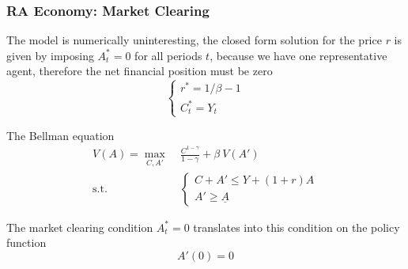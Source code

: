 \documentclass[10pt, aspectratio=1610, natbib, handout]{beamer}
\begin{document}
  \begin{frame}
    \frametitle{RA Economy: Market Clearing}

    The model is numerically uninteresting, the closed form solution for the price $r$ is given by imposing $A_t^* = 0$ for all periods $t$, because we have one representative agent, therefore the net financial position must be zero
    \begin{equation*}
      \begin{cases}
        r^* = 1 / \beta - 1 \\
        C_t^* = Y_t
      \end{cases}
    \end{equation*}

    \vfill\pause

    The Bellman equation
    \begin{align*}
      V(A) = \max_{C, A'} &\; \frac{C^{1-\gamma}}{1-\gamma} + \beta\ V(A') \\
      \text{s.t.} &\;
      \begin{cases}
        C + A' \leq Y + (1 + r) A \\
        A' \geq \underline{A}
      \end{cases}
    \end{align*}

    \vfill\pause

    The market clearing condition $A_t^* = 0$ translates into this condition on the policy function
    \begin{equation*}
      A'(0) = 0
    \end{equation*}

  \end{frame}
\end{document}
